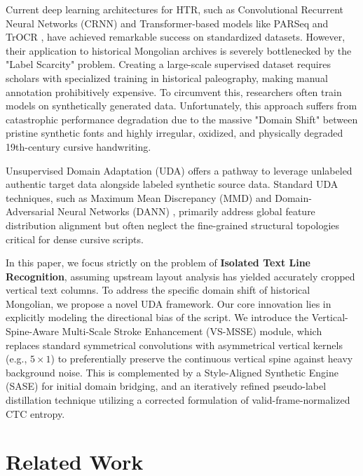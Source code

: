 \documentclass[11pt]{article}
\begin{document}
Current deep learning architectures for HTR, such as Convolutional Recurrent Neural Networks (CRNN) \cite{shi2016end} and Transformer-based models like PARSeq \cite{bautista2022parseq} and TrOCR \cite{li2021trocr}, have achieved remarkable success on standardized datasets. However, their application to historical Mongolian archives is severely bottlenecked by the "Label Scarcity" problem. Creating a large-scale supervised dataset requires scholars with specialized training in historical paleography, making manual annotation prohibitively expensive. To circumvent this, researchers often train models on synthetically generated data. Unfortunately, this approach suffers from catastrophic performance degradation due to the massive "Domain Shift" between pristine synthetic fonts and highly irregular, oxidized, and physically degraded 19th-century cursive handwriting.

Unsupervised Domain Adaptation (UDA) offers a pathway to leverage unlabeled authentic target data alongside labeled synthetic source data. Standard UDA techniques, such as Maximum Mean Discrepancy (MMD) \cite{tzeng2014deep} and Domain-Adversarial Neural Networks (DANN) \cite{ganin2015unsupervised}, primarily address global feature distribution alignment but often neglect the fine-grained structural topologies critical for dense cursive scripts.

In this paper, we focus strictly on the problem of \textbf{Isolated Text Line Recognition}, assuming upstream layout analysis has yielded accurately cropped vertical text columns. To address the specific domain shift of historical Mongolian, we propose a novel UDA framework. Our core innovation lies in explicitly modeling the directional bias of the script. We introduce the Vertical-Spine-Aware Multi-Scale Stroke Enhancement (VS-MSSE) module, which replaces standard symmetrical convolutions with asymmetrical vertical kernels (e.g., $5\times1$) to preferentially preserve the continuous vertical spine against heavy background noise. This is complemented by a Style-Aligned Synthetic Engine (SASE) for initial domain bridging, and an iteratively refined pseudo-label distillation technique utilizing a corrected formulation of valid-frame-normalized CTC entropy.

\section{Related Work}
\end{document}
